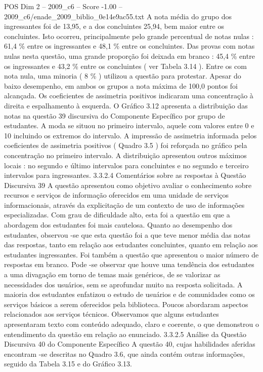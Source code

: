 \begin{textsample}{POS Dim 2 – 2009\_c6 – Score -1.00 – 2009\_c6/enade\_2009\_biblio\_0e14e9ac55.txt}
A nota média do grupo dos ingressantes foi de 13,95, e a dos concluintes 25,94, bem maior entre os concluintes.
Isto ocorreu, principalmente pelo grande percentual de notas nulas : 61,4 \% entre os ingressantes e 48,1 \% entre os concluintes.
Das provas com notas nulas nesta questão, uma grande proporção foi deixada em branco : 45,4 \% entre os ingressantes e 43,2 \% entre os concluintes ( ver Tabela 3.14 ).
Entre os com nota nula, uma minoria ( 8 \% ) utilizou a questão para protestar.
Apesar do baixo desempenho, em ambos os grupos a nota máxima de 100,0 pontos foi alcançada.
Os coeficientes de assimetria positivos indicaram uma concentração à direita e espalhamento à esquerda.
O Gráfico 3.12 apresenta a distribuição das notas na questão 39 discursiva do Componente Específico por grupo de estudantes.
A moda se situou no primeiro intervalo, aquele com valores entre 0 e 10 incluindo os extremos do intervalo.
A impressão de assimetria informada pelos coeficientes de assimetria positivos ( Quadro 3.5 ) foi reforçada no gráfico pela concentração no primeiro intervalo.
A distribuição apresentou outros máximos locais : no segundo e último intervalos para concluintes e no segundo e terceiro intervalos para ingressantes. 3.3.2.4 Comentários sobre as respostas à Questão Discursiva 39 A questão apresentou como objetivo avaliar o conhecimento sobre recursos e serviços de informação oferecidos em uma unidade de serviços informacionais, através da explicitação de um contexto de uso de informações especializadas.
Com grau de dificuldade alto, esta foi a questão em que a abordagem dos estudantes foi mais cautelosa.
Quanto ao desempenho dos estudantes, observou -se que esta questão foi a que teve menor média das notas das respostas, tanto em relação aos estudantes concluintes, quanto em relação aos estudantes ingressantes.
Foi também a questão que apresentou o maior número de respostas em branco.
Pode -se observar que houve uma tendência dos estudantes a uma divagação em torno de temas mais genéricos, de se valorizar as necessidades dos usuários, sem se aprofundar muito na resposta solicitada.
A maioria dos estudantes enfatizou o estudo de usuários e de comunidades como os serviços básicos a serem oferecidos pela biblioteca.
Poucos abordaram aspectos relacionados aos serviços técnicos.
Observamos que alguns estudantes apresentaram texto com conteúdo adequado, claro e coerente, o que demonstrou o entendimento da questão em relação ao enunciado. 3.3.2.5 Análise da Questão Discursiva 40 do Componente Específico A questão 40, cujas habilidades aferidas encontram -se descritas no Quadro 3.6, que ainda contém outras informações, seguido da Tabela 3.15 e do Gráfico 3.13.

\end{textsample}
